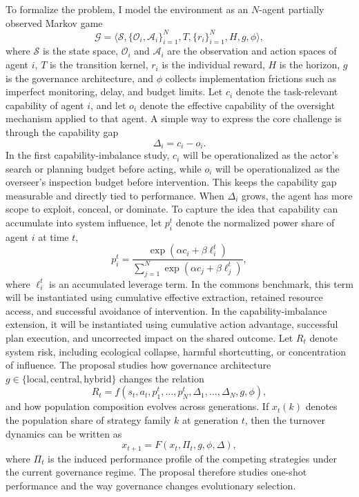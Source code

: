 \documentclass[10pt]{article}
\begin{document}
To formalize the problem, I model the environment as an $N$-agent partially observed Markov game
\[
\mathcal{G}=\langle \mathcal{S}, \{\mathcal{O}_i,\mathcal{A}_i\}_{i=1}^N, T, \{r_i\}_{i=1}^N, H, g, \phi \rangle,
\]
where $\mathcal{S}$ is the state space, $\mathcal{O}_i$ and $\mathcal{A}_i$ are the observation and action spaces of agent $i$, $T$ is the transition kernel, $r_i$ is the individual reward, $H$ is the horizon, $g$ is the governance architecture, and $\phi$ collects implementation frictions such as imperfect monitoring, delay, and budget limits. Let $c_i$ denote the task-relevant capability of agent $i$, and let $o_i$ denote the effective capability of the oversight mechanism applied to that agent. A simple way to express the core challenge is through the capability gap
\[
\Delta_i = c_i - o_i.
\]
In the first capability-imbalance study, $c_i$ will be operationalized as the actor's search or planning budget before acting, while $o_i$ will be operationalized as the overseer's inspection budget before intervention. This keeps the capability gap measurable and directly tied to performance.
When $\Delta_i$ grows, the agent has more scope to exploit, conceal, or dominate. To capture the idea that capability can accumulate into system influence, let $p_i^t$ denote the normalized power share of agent $i$ at time $t$,
\[
p_i^t = \frac{\exp(\alpha c_i + \beta \ell_i^t)}{\sum_{j=1}^N \exp(\alpha c_j + \beta \ell_j^t)},
\]
where $\ell_i^t$ is an accumulated leverage term. In the commons benchmark, this term will be instantiated using cumulative effective extraction, retained resource access, and successful avoidance of intervention. In the capability-imbalance extension, it will be instantiated using cumulative action advantage, successful plan execution, and uncorrected impact on the shared outcome. Let $R_t$ denote system risk, including ecological collapse, harmful shortcutting, or concentration of influence. The proposal studies how governance architecture $g \in \{\text{local}, \text{central}, \text{hybrid}\}$ changes the relation
\[
R_t = f(s_t, a_t, p_1^t,\dots,p_N^t,\Delta_1,\dots,\Delta_N,g,\phi),
\]
and how population composition evolves across generations. If $x_t(k)$ denotes the population share of strategy family $k$ at generation $t$, then the turnover dynamics can be written as
\[
x_{t+1} = F(x_t,\Pi_t,g,\phi,\Delta),
\]
where $\Pi_t$ is the induced performance profile of the competing strategies under the current governance regime. The proposal therefore studies one-shot performance and the way governance changes evolutionary selection.
\end{document}
